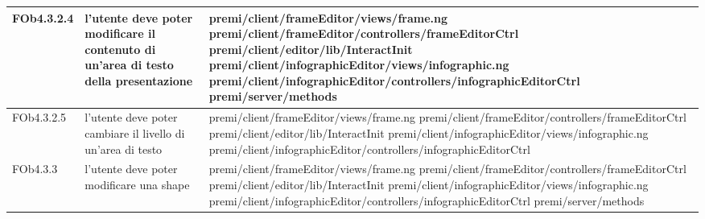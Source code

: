 \begin{longtable}{|l|p{5cm}|p{7cm}|}
\hline
FOb4.3.2.4 & l'utente deve poter modificare il contenuto di un'area di testo della presentazione & \hspace{0pt}premi/client/frameEditor/views/frame.ng \linebreak \linebreak premi/client/frameEditor/controllers/frameEditorCtrl \linebreak \linebreak premi/client/editor/lib/InteractInit \linebreak \linebreak premi/client/infographicEditor/views/infographic.ng \linebreak \linebreak premi/client/infographicEditor/controllers/infographicEditorCtrl  \linebreak \linebreak premi/server/methods \\
\hline
FOb4.3.2.5 & l'utente deve poter cambiare il livello di un'area di testo & \hspace{0pt}premi/client/frameEditor/views/frame.ng \linebreak \linebreak premi/client/frameEditor/controllers/frameEditorCtrl \linebreak \linebreak premi/client/editor/lib/InteractInit \linebreak \linebreak premi/client/infographicEditor/views/infographic.ng \linebreak \linebreak premi/client/infographicEditor/controllers/infographicEditorCtrl \\
\hline
FOb4.3.3 & l'utente deve poter modificare una shape & \hspace{0pt}premi/client/frameEditor/views/frame.ng \linebreak \linebreak premi/client/frameEditor/controllers/frameEditorCtrl \linebreak \linebreak premi/client/editor/lib/InteractInit \linebreak \linebreak premi/client/infographicEditor/views/infographic.ng \linebreak \linebreak premi/client/infographicEditor/controllers/infographicEditorCtrl  \linebreak \linebreak premi/server/methods \\

\end{longtable}
